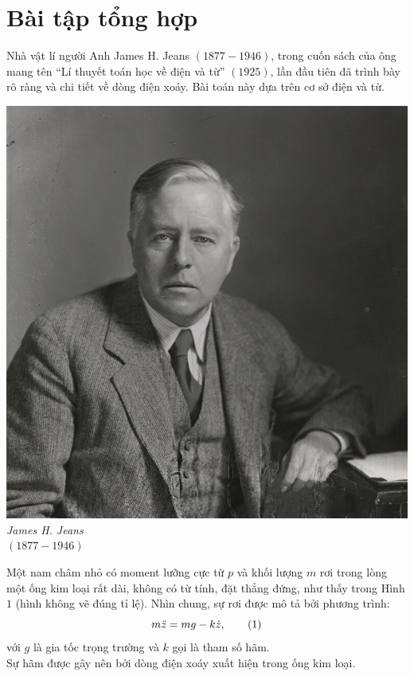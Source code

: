 \chapter{Bài tập tổng hợp}

\begin{vd}
Nhà vật lí người Anh James H. Jeans $(1877-1946)$, trong cuốn sách của ông mang tên “Lí thuyết toán học về điện và từ” $(1925)$, lần đầu tiên đã trình bày rõ ràng và chi tiết về dòng điện xoáy. Bài toán này dựa trên cơ sở điện và từ.
\begin{center}
    \includegraphics[scale=0.2]{Anh/APho2012.1.jpg}\\
    \textit{James H. Jeans}\\
    $(1877-1946)$
\end{center}
Một nam châm nhỏ có moment lưỡng cực từ $p$ và khối lượng $m$ rơi trong lòng một ống kim loại rất dài, không có từ tính, đặt thẳng đứng, như thấy trong Hình $1$ (hình không vẽ đúng tỉ lệ). Nhìn chung, sự rơi được mô tả bởi phương trình: 
\[m\Ddot{z}=mg-k\Dot{z},\tag{1} \label{i2012.1}\]
với $g$ là gia tốc trọng trường và $k$ gọi là tham số hãm.\\ Sự hãm được gây nên bởi dòng điện xoáy xuất hiện trong ống kim loại. 
\begin{center}


\end{center}
\end{vd}
